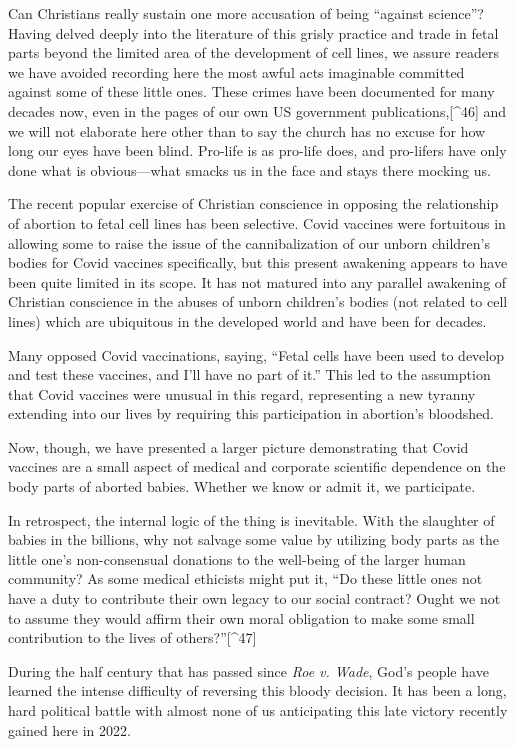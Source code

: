 \documentclass[
]{book}
\begin{document}
Can Christians really sustain one more accusation of being ``against science''? Having delved deeply into the literature of this grisly practice and trade in fetal parts beyond the limited area of the development of cell lines, we assure readers we have avoided recording here the most awful acts imaginable committed against some of these little ones. These crimes have been documented for many decades now, even in the pages of our own US government publications,{[}\^{}46{]} and we will not elaborate here other than to say the church has no excuse for how long our eyes have been blind. Pro-life is as pro-life does, and pro-lifers have only done what is obvious---what smacks us in the face and stays there mocking us.

The recent popular exercise of Christian conscience in opposing the relationship of abortion to fetal cell lines has been selective. Covid vaccines were fortuitous in allowing some to raise the issue of the cannibalization of our unborn children's bodies for Covid vaccines specifically, but this present awakening appears to have been quite limited in its scope. It has not matured into any parallel awakening of Christian conscience in the abuses of unborn children's bodies (not related to cell lines) which are ubiquitous in the developed world and have been for decades.

Many opposed Covid vaccinations, saying, ``Fetal cells have been used to develop and test these vaccines, and I'll have no part of it.'' This led to the assumption that Covid vaccines were unusual in this regard, representing a new tyranny extending into our lives by requiring this participation in abortion's bloodshed.

Now, though, we have presented a larger picture demonstrating that Covid vaccines are a small aspect of medical and corporate scientific dependence on the body parts of aborted babies. Whether we know or admit it, we participate.

In retrospect, the internal logic of the thing is inevitable. With the slaughter of babies in the billions, why not salvage some value by utilizing body parts as the little one's non-consensual donations to the well-being of the larger human community? As some medical ethicists might put it, ``Do these little ones not have a duty to contribute their own legacy to our social contract? Ought we not to assume they would affirm their own moral obligation to make some small contribution to the lives of others?''{[}\^{}47{]}

During the half century that has passed since \emph{Roe v. Wade}, God's people have learned the intense difficulty of reversing this bloody decision. It has been a long, hard political battle with almost none of us anticipating this late victory recently gained here in 2022.
\end{document}
